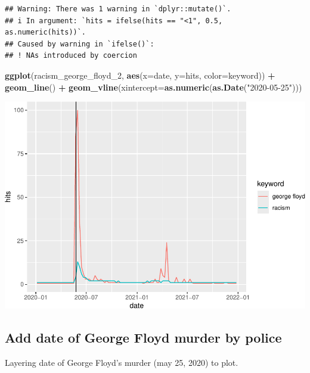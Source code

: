 \documentclass[
]{article}
\newenvironment{Shaded}{\begin{snugshade}}{\end{snugshade}}
\newcommand{\AttributeTok}[1]{\textcolor[rgb]{0.13,0.29,0.53}{#1}}
\newcommand{\FunctionTok}[1]{\textcolor[rgb]{0.13,0.29,0.53}{\textbf{#1}}}
\newcommand{\NormalTok}[1]{#1}
\newcommand{\SpecialCharTok}[1]{\textcolor[rgb]{0.81,0.36,0.00}{\textbf{#1}}}
\newcommand{\StringTok}[1]{\textcolor[rgb]{0.31,0.60,0.02}{#1}}
\begin{document}
\begin{verbatim}
## Warning: There was 1 warning in `dplyr::mutate()`.
## i In argument: `hits = ifelse(hits == "<1", 0.5, as.numeric(hits))`.
## Caused by warning in `ifelse()`:
## ! NAs introduced by coercion
\end{verbatim}

\begin{Shaded}
\begin{Highlighting}[]
\FunctionTok{ggplot}\NormalTok{(racism\_george\_floyd\_2, }\FunctionTok{aes}\NormalTok{(}\AttributeTok{x=}\NormalTok{date, }\AttributeTok{y=}\NormalTok{hits, }\AttributeTok{color=}\NormalTok{keyword)) }\SpecialCharTok{+}
  \FunctionTok{geom\_line}\NormalTok{() }\SpecialCharTok{+}
  \FunctionTok{geom\_vline}\NormalTok{(}\AttributeTok{xintercept=}\FunctionTok{as.numeric}\NormalTok{(}\FunctionTok{as.Date}\NormalTok{(}\StringTok{"2020{-}05{-}25"}\NormalTok{)))}
\end{Highlighting}
\end{Shaded}

\includegraphics{overview-keyword-racism_files/figure-latex/unnamed-chunk-8-1.pdf}

\hypertarget{add-date-of-george-floyd-murder-by-police}{%
\subsection{Add date of George Floyd murder by
police}\label{add-date-of-george-floyd-murder-by-police}}

Layering date of George Floyd's murder (may 25, 2020) to plot.
\end{document}
